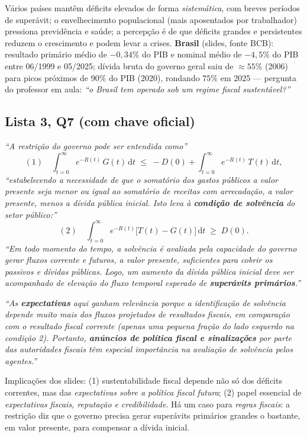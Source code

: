 \documentclass[12pt, a4paper]{article}
\newcommand{\dif}{\mathrm{d}}
\begin{document}
Vários países mantêm déficits elevados de forma \emph{sistemática}, com breves
períodos de superávit; o envelhecimento populacional (mais aposentados por
trabalhador) pressiona previdência e saúde; a percepção é de que déficits
grandes e persistentes reduzem o crescimento e podem levar a crises.
\textbf{Brasil} (slides, fonte BCB): resultado primário médio de
$-0{,}34\%$ do PIB e nominal médio de $-4{,}5\%$ do PIB entre 06/1999 e
05/2025; dívida bruta do governo geral saiu de $\approx 55\%$ (2006) para picos
próximos de $90\%$ do PIB (2020), rondando $75\%$ em 2025 --- pergunta do
professor em aula: \emph{``o Brasil tem operado sob um regime fiscal
sustentável?''}

\subsection{Lista 3, Q7 (com chave oficial)}

\begin{correctbox}[title={Chave oficial (Q7): a restrição e o papel das expectativas}]
\emph{``A restrição do governo pode ser entendida como''}
\[
(1)\quad \int_{t=0}^{\infty} e^{-R(t)}\,G(t)\,\dif t
\;\leq\; -D(0) + \int_{t=0}^{\infty} e^{-R(t)}\,T(t)\,\dif t,
\]
\emph{``estabelecendo a necessidade de que o somatório dos gastos públicos a
valor presente seja menor ou igual ao somatório de receitas com arrecadação, a
valor presente, menos a dívida pública inicial. Isto leva à \textbf{condição de
solvência} do setor público:''}
\[
(2)\quad \int_{t=0}^{\infty} e^{-R(t)}\bigl[T(t) - G(t)\bigr]\,\dif t
\;\geq\; D(0).
\]
\emph{``Em todo momento do tempo, a solvência é avaliada pela capacidade do
governo gerar fluxos corrente e futuros, a valor presente, suficientes para
cobrir os passivos e dívidas públicas. Logo, um aumento da dívida pública
inicial deve ser acompanhado de elevação do fluxo temporal esperado de
\textbf{superávits primários}.''}

\emph{``As \textbf{expectativas} aqui ganham relevância porque a identificação
de solvência depende muito mais dos fluxos \emph{projetados} de resultados
fiscais, em comparação com o resultado fiscal corrente (apenas uma pequena
fração do lado esquerdo na condição 2). Portanto, \textbf{anúncios de política
fiscal e sinalizações} por parte das autoridades fiscais têm especial
importância na avaliação de solvência pelos agentes.''}
\end{correctbox}

Implicações dos slides: (1) sustentabilidade fiscal depende não só dos
déficits correntes, mas das \emph{expectativas sobre a política fiscal
futura}; (2) papel essencial de \emph{expectativas fiscais, reputação e
credibilidade}. Há um caso para \emph{regras fiscais}: a restrição diz que o
governo precisa gerar superávits primários grandes o bastante, em valor
presente, para compensar a dívida inicial.
\end{document}
